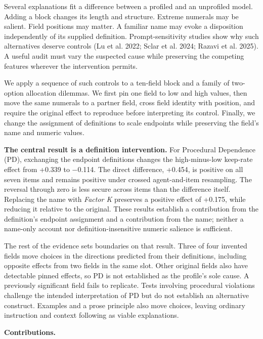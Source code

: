 \documentclass[
  11pt]{article}
\begin{document}
Several explanations fit a difference between a profiled and an
unprofiled model. Adding a block changes its length and structure.
Extreme numerals may be salient. Field positions may matter. A familiar
name may evoke a disposition independently of its supplied definition.
Prompt-sensitivity studies show why such alternatives deserve controls
(Lu et al. 2022; Sclar et al. 2024; Razavi et al. 2025). A useful audit
must vary the suspected cause while preserving the competing features
wherever the intervention permits.

We apply a sequence of such controls to a ten-field block and a family
of two-option allocation dilemmas. We first pin one field to low and
high values, then move the same numerals to a partner field, cross field
identity with position, and require the original effect to reproduce
before interpreting its control. Finally, we change the assignment of
definitions to scale endpoints while preserving the field's name and
numeric values.

\textbf{The central result is a definition intervention.} For Procedural
Dependence (PD), exchanging the endpoint definitions changes the
high-minus-low keep-rate effect from +0.339 to −0.114. The direct
difference, +0.454, is positive on all seven items and remains positive
under crossed agent-and-item resampling. The reversal through zero is
less secure across items than the difference itself. Replacing the name
with \emph{Factor K} preserves a positive effect of +0.175, while
reducing it relative to the original. These results establish a
contribution from the definition's endpoint assignment and a
contribution from the name; neither a name-only account nor
definition-insensitive numeric salience is sufficient.

The rest of the evidence sets boundaries on that result. Three of four
invented fields move choices in the directions predicted from their
definitions, including opposite effects from two fields in the same
slot. Other original fields also have detectable pinned effects, so PD
is not established as the profile's sole cause. A previously significant
field fails to replicate. Tests involving procedural violations
challenge the intended interpretation of PD but do not establish an
alternative construct. Examples and a prose principle also move choices,
leaving ordinary instruction and context following as viable
explanations.

\textbf{Contributions.}
\end{document}
